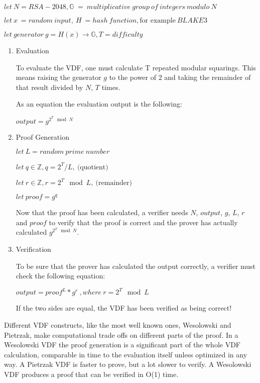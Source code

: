 \( let \: N = RSA-2048, \mathbb{G} \; = \: multiplicative \: group \: of \: integers \: modulo \: N \)

\( let \: x \: = random \: input,  \: H \: = hash \: function, \text{for example} \: BLAKE3 \)

\( let \: generator \: g = H(x) \to \mathbb{G}, T = difficulty \)
\begin{enumerate}
	\item{Evaluation}
																	
	To evaluate the VDF, one must calculate T repeated modular squarings. This means raising the generator $g$ to the power of 2 and taking the remainder of that result divided by $N$, $T$ times.
																	
	As an equation the evaluation output is the following:
																	
	\( output = g^{2^{T} \mod N } \) 
																	
	\item{Proof Generation}
																	
	\( let \: L = random \: prime \: number \)
																	
	\( let \: q \in \mathbb{Z}, q = 2^T/L, \: \text{(quotient)} \)
																	
	\( let \: r \in \mathbb{Z}, r = 2^T\mod L, \: \text{(remainder)} \)
																	
	\( let \: proof = g^q \) 
																	
	Now that the proof has been calculated, a verifier needs $N$, $output$, $g$, $L$, $r$ and $proof$ to verify that the proof is correct and the prover has actually calculated $g^{2^{T} \mod N }$.
																	
	\item{Verification}
																	
	To be sure that the prover has calculated the output correctly, a verifier must check the following equation:
																	
	\( output = proof^L * g^r \:, where \: r = 2^T \mod L \)
																	
	If the two sides are equal, the VDF has been verified as being correct!
\end{enumerate}

Different VDF constructs, like the most well known ones, Wesolowski and Pietrzak, make computational trade offs on different parts of the proof. In a Wesolowski VDF the proof generation is a significant part of the whole VDF calculation, comparable in time to the evaluation itself unless optimized in any way. A Pietrzak VDF is faster to prove, but a lot slower to verify. A Wesolowski VDF produces a proof that can be verified in O(1) time.

